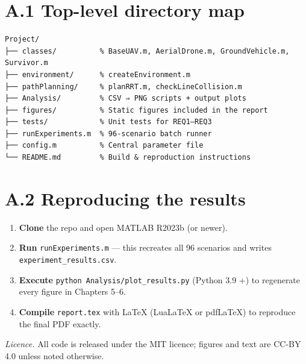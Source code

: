 \documentclass[12pt,a4paper]{report}
\begin{document}
\section*{A.1 Top-level directory map}

\begin{verbatim}
Project/
├── classes/          % BaseUAV.m, AerialDrone.m, GroundVehicle.m, Survivor.m
├── environment/      % createEnvironment.m
├── pathPlanning/     % planRRT.m, checkLineCollision.m
├── Analysis/         % CSV ⇒ PNG scripts + output plots
├── figures/          % Static figures included in the report
├── tests/            % Unit tests for REQ1–REQ3
├── runExperiments.m  % 96-scenario batch runner
├── config.m          % Central parameter file
└── README.md         % Build & reproduction instructions
\end{verbatim}

\section*{A.2 Reproducing the results}

\begin{enumerate}[leftmargin=2.2em]
  \item \textbf{Clone} the repo and open MATLAB R2023b (or newer).
  \item \textbf{Run} \verb|runExperiments.m| — this recreates all 96 scenarios  
        and writes \texttt{experiment\_results.csv}.
  \item \textbf{Execute} \verb|python Analysis/plot_results.py| (Python 3.9 +)  
        to regenerate every figure in Chapters 5–6.
  \item \textbf{Compile} \verb|report.tex| with \LaTeX{} (LuaLaTeX or pdf\LaTeX)  
        to reproduce the final PDF exactly.
\end{enumerate}

\bigskip
\noindent\textit{Licence.} All code is released under the MIT licence; figures and
text are CC-BY 4.0 unless noted otherwise.





\end{document}
